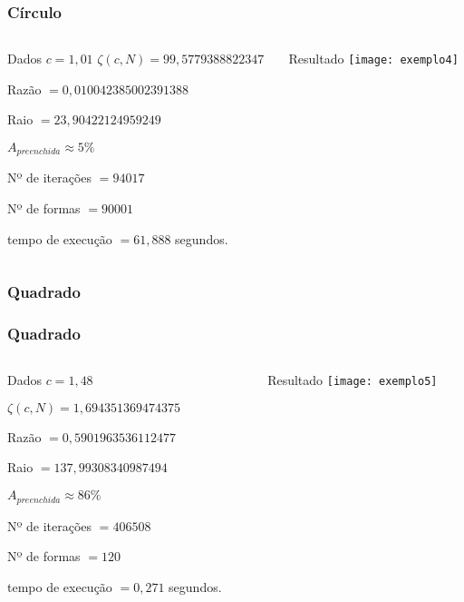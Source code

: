 \documentclass[aspectratio=169,11pt,red]{beamer}
\begin{document}
\begin{frame}
\frametitle{Círculo}

\begin{columns}[T]
\begin{column}{.5\textwidth}
\begin{block}{\centering Dados}
$c=1,01$
\smallskip
$\zeta(c,N)=99,5779388822347$
\smallskip

Razão $=0,010042385002391388$
\smallskip

Raio $=23,90422124959249$
\smallskip

$A_{preenchida} \approx 5\%$
\smallskip

Nº de iterações $=94017$
\smallskip

Nº de formas $=90001$
\smallskip

tempo de execução $=61,888$ segundos.
\smallskip
\end{block}
\end{column}

\begin{column}{.5\textwidth}
\begin{block}{\centering Resultado}
\centering
\texttt{[image: exemplo4]}
\end{block}
\end{column}
\end{columns}
\end{frame}

\subsubsection{Quadrado}
\begin{frame}
\frametitle{Quadrado}
\begin{columns}[T]
\begin{column}{.5\textwidth}
\begin{block}{\centering Dados}
$c=1,48$
\smallskip

$\zeta(c,N)=1,694351369474375$
\smallskip

Razão $=0,5901963536112477$
\smallskip

Raio $=137,99308340987494$
\smallskip

$A_{preenchida} \approx 86\%$
\smallskip

Nº de iterações $=406508$
\smallskip

Nº de formas $=120$
\smallskip

tempo de execução $= 0,271$ segundos.
\smallskip
\end{block}
\end{column}

\begin{column}{.5\textwidth}
\begin{block}{\centering Resultado}
\centering
\texttt{[image: exemplo5]}
\end{block}
\end{column}
\end{columns}
\end{frame}
\end{document}
